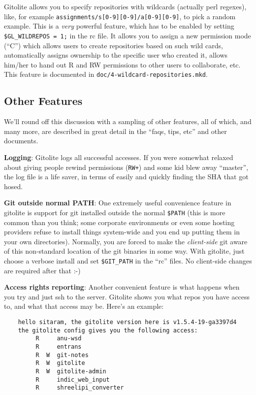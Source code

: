 \documentclass[a4paper]{book}
\begin{document}
Gitolite allows you to specify repositories with wildcards (actually perl regexes), like, for example \texttt{assignments/s{[}0-9{]}{[}0-9{]}/a{[}0-9{]}{[}0-9{]}}, to pick a random example. This is a \emph{very} powerful feature, which has to be enabled by setting \texttt{\$GL\_WILDREPOS = 1;} in the rc file. It allows you to assign a new permission mode (“C”) which allows users to create repositories based on such wild cards, automatically assigns ownership to the specific user who created it, allows him/her to hand out R and RW permissions to other users to collaborate, etc. This feature is documented in \texttt{doc/4-wildcard-repositories.mkd}.

\subsection{Other Features}

We'll round off this discussion with a sampling of other features, all of which, and many more, are described in great detail in the “faqs, tips, etc” and other documents.

\textbf{Logging}: Gitolite logs all successful accesses. If you were somewhat relaxed about giving people rewind permissions (\texttt{RW+}) and some kid blew away “master”, the log file is a life saver, in terms of easily and quickly finding the SHA that got hosed.

\textbf{Git outside normal PATH}: One extremely useful convenience feature in gitolite is support for git installed outside the normal \texttt{\$PATH} (this is more common than you think; some corporate environments or even some hosting providers refuse to install things system-wide and you end up putting them in your own directories). Normally, you are forced to make the \emph{client-side} git aware of this non-standard location of the git binaries in some way. With gitolite, just choose a verbose install and set \texttt{\$GIT\_PATH} in the “rc” files. No client-side changes are required after that :-)

\textbf{Access rights reporting}: Another convenient feature is what happens when you try and just ssh to the server. Gitolite shows you what repos you have access to, and what that access may be. Here's an example:

\begin{shaded}\begin{verbatim}
    hello sitaram, the gitolite version here is v1.5.4-19-ga3397d4
    the gitolite config gives you the following access:
         R     anu-wsd
         R     entrans
         R  W  git-notes
         R  W  gitolite
         R  W  gitolite-admin
         R     indic_web_input
         R     shreelipi_converter
\end{verbatim}\end{shaded}
\end{document}
